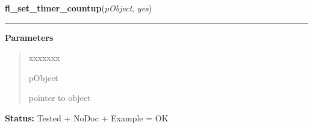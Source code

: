 \hspace{.8\funcindent}\begin{boxedminipage}{\funcwidth}

    \raggedright \textbf{fl\_set\_timer\_countup}(\textit{pObject}, \textit{yes})

    \vspace{-1.5ex}

    \rule{\textwidth}{0.5\fboxrule}
\setlength{\parskip}{2ex}
\setlength{\parskip}{1ex}
      \textbf{Parameters}
      \vspace{-1ex}

      \begin{quote}
        \begin{Ventry}{xxxxxxx}

          \item[pObject]

          pointer to object

        \end{Ventry}

      \end{quote}

\textbf{Status:} Tested + NoDoc + Example = OK



    \end{boxedminipage}

    \label{xformslib:library:fl_set_timer_filter}

    \vspace{0.5ex}

